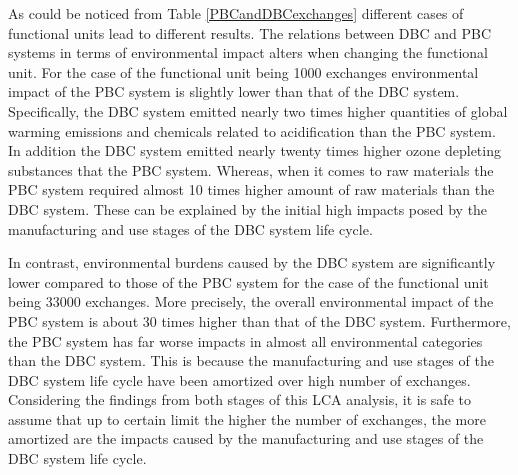 \documentclass[conference]{IEEEtran}
\begin{document}
As could be noticed from Table \ref{PBCandDBCexchanges} different cases of functional units lead to different results. The relations between DBC and PBC systems in terms of environmental impact alters when changing the functional unit. For the case of the functional unit being 1000 exchanges environmental impact of the PBC system is slightly lower than that of the DBC system. Specifically, the DBC system emitted nearly two times higher quantities of global warming emissions and chemicals  related to acidification than the PBC system. In addition the DBC system emitted nearly twenty times higher ozone depleting substances that the PBC system. Whereas, when it comes to raw materials the PBC system required almost 10 times higher amount of raw materials than the DBC system. These can be explained by the initial high impacts posed by the manufacturing and use stages of the DBC system life cycle. 

In contrast, environmental burdens caused by the DBC system are significantly lower compared to those of the PBC system for the case of the functional unit being 33000 exchanges. More precisely, the overall environmental impact of the PBC system is about 30 times higher than that of the DBC system. Furthermore, the PBC system has far worse impacts in almost all environmental categories than the DBC system. This is because the manufacturing and use stages of the DBC system life cycle have been amortized over high number of exchanges. Considering the findings from both stages of this LCA analysis, it is safe to assume that up to certain limit the higher the number of exchanges, the more amortized are the impacts caused by the manufacturing and use stages of the DBC system life cycle.
\end{document}

